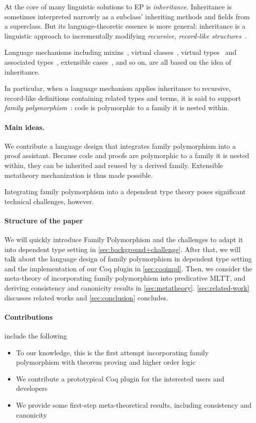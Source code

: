 At the core of many linguistic solutions to EP is \emph{inheritance}.
Inheritance is sometimes interpreted narrowly as a subclass'
inheriting methods and fields from a superclass.
But its language-theoretic essence is more general:
inheritance is a linguistic approach to incrementally
modifying \emph{recursive, record-like structures}~\cite{cook1990inheritance}.

Language mechanisms including
mixins~\cite{mixin-1990},
virtual classes~\cite{virtualclasses-1989,vc-calculus-2006},
virtual types~\cite{thorup97} and associated types~\cite{ckj05},
extensible cases~\cite{bac2006},
and so on, are all based on the idea of inheritance.

In particular, when a language mechanism applies inheritance to
recursive, record-like definitions containing related types and terms,
it is said to support \emph{family polymorphism}~\cite{ernst2001family}:
code is polymorphic to a family it is nested within.

\paragraph{Main ideas.}

We contribute a language design that integrates family polymorphism into
a proof assistant.
Because code and proofs are polymorphic to a family it is nested
within, they can be inherited and reused by a derived family.
Extensible metatheory mechanization is thus made possible.

Integrating family polymorphism into a dependent type theory poses
significant technical challenges, however.
\TODO

\paragraph{Structure of the paper} 
We will quickly introduce Family Polymorphism and the challenges to adapt it into dependent type setting in \cref{sec:background+challenge}. After that, we will talk about the language design of family polymorphism in dependent type setting and the implementation of our Coq plugin in \cref{sec:coqimpl}. Then, we consider the meta-theory of incorporating family polymorphism into predicative MLTT, and deriving consistency and canonicity results in \cref{sec:metatheory}. \ref{sec:related-work} discusses related works and \ref{sec:conclusion} concludes.


\paragraph{Contributions} include the following
\begin{itemize}
  \item To our knowledge, this is the first attempt incorporating family polymorphism with theorem proving and higher order logic
  \item We contribute a prototypical Coq plugin for the interested users and developers 
  \item We provide some first-step meta-theoretical results, including consistency and canonicity
\end{itemize}

